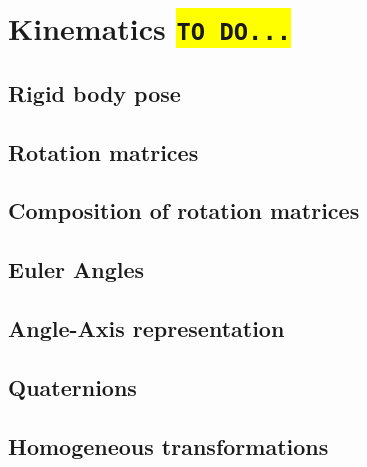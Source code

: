 \chapter{Kinematics \colorbox{yellow}{\texttt{TO DO...}}}
\section{Rigid body pose}
\section{Rotation matrices}
\section{Composition of rotation matrices}
\section{Euler Angles}
\section{Angle-Axis representation}
\section{Quaternions}
\section{Homogeneous transformations}